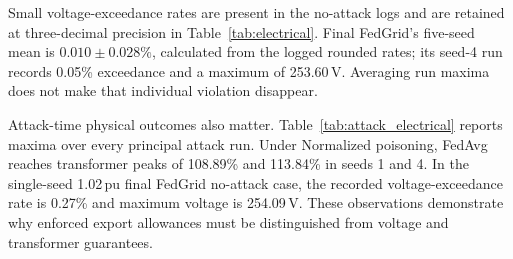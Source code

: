 Small voltage-exceedance rates are present in the no-attack logs and are retained at three-decimal precision in Table~\ref{tab:electrical}. Final FedGrid's five-seed mean is $0.010\pm0.028\%$, calculated from the logged rounded rates; its seed-4 run records 0.05\% exceedance and a maximum of 253.60\,V. Averaging run maxima does not make that individual violation disappear.

Attack-time physical outcomes also matter. Table~\ref{tab:attack_electrical} reports maxima over every principal attack run. Under Normalized poisoning, FedAvg reaches transformer peaks of 108.89\% and 113.84\% in seeds 1 and 4. In the single-seed 1.02\,pu final FedGrid no-attack case, the recorded voltage-exceedance rate is 0.27\% and maximum voltage is 254.09\,V. These observations demonstrate why enforced export allowances must be distinguished from voltage and transformer guarantees.
